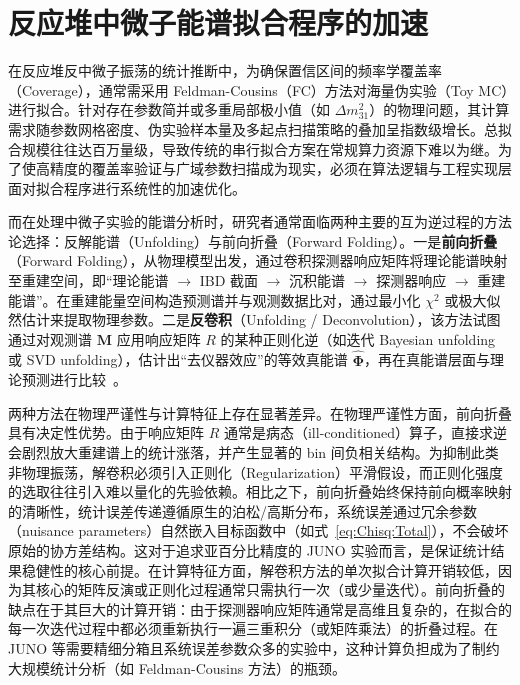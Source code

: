 \chapter{反应堆中微子能谱拟合程序的加速}

在反应堆反中微子振荡的统计推断中，为确保置信区间的频率学覆盖率（Coverage），通常需采用 Feldman-Cousins（FC）方法对海量伪实验（Toy MC）进行拟合。针对存在参数简并或多重局部极小值（如 $\Delta m^2_{31}$）的物理问题，其计算需求随参数网格密度、伪实验样本量及多起点扫描策略的叠加呈指数级增长。总拟合规模往往达百万量级，导致传统的串行拟合方案在常规算力资源下难以为继。为了使高精度的覆盖率验证与广域参数扫描成为现实，必须在算法逻辑与工程实现层面对拟合程序进行系统性的加速优化。

而在处理中微子实验的能谱分析时，研究者通常面临两种主要的互为逆过程的方法论选择：反解能谱（Unfolding）与前向折叠（Forward Folding）。一是\textbf{前向折叠}（Forward Folding），从物理模型出发，通过卷积探测器响应矩阵将理论能谱映射至重建空间，即“理论能谱 $\to$ IBD 截面 $\to$ 沉积能谱 $\to$ 探测器响应 $\to$ 重建能谱”。在重建能量空间构造预测谱并与观测数据比对，通过最小化 $\chi^2$ 或极大似然估计来提取物理参数。二是\textbf{反卷积}（Unfolding / Deconvolution），该方法试图通过对观测谱 $\boldsymbol{M}$ 应用响应矩阵 $R$ 的某种正则化逆（如迭代 Bayesian unfolding 或 SVD unfolding），估计出“去仪器效应”的等效真能谱 $\hat{\boldsymbol{\Phi}}$，再在真能谱层面与理论预测进行比较~\cite{An2021Unfolding, Canelli2025}。

两种方法在物理严谨性与计算特征上存在显著差异。在物理严谨性方面，前向折叠具有决定性优势。由于响应矩阵 $R$ 通常是病态（ill-conditioned）算子，直接求逆会剧烈放大重建谱上的统计涨落，并产生显著的 bin 间负相关结构。为抑制此类非物理振荡，解卷积必须引入正则化（Regularization）平滑假设，而正则化强度的选取往往引入难以量化的先验依赖。相比之下，前向折叠始终保持前向概率映射的清晰性，统计误差传递遵循原生的泊松/高斯分布，系统误差通过冗余参数（nuisance parameters）自然嵌入目标函数中（如式~\eqref{eq:Chisq:Total}），不会破坏原始的协方差结构。这对于追求亚百分比精度的 JUNO 实验而言，是保证统计结果稳健性的核心前提。在计算特征方面，解卷积方法的单次拟合计算开销较低，因为其核心的矩阵反演或正则化过程通常只需执行一次（或少量迭代）。前向折叠的缺点在于其巨大的计算开销：由于探测器响应矩阵通常是高维且复杂的，在拟合的每一次迭代过程中都必须重新执行一遍三重积分（或矩阵乘法）的折叠过程。在 JUNO 等需要精细分箱且系统误差参数众多的实验中，这种计算负担成为了制约大规模统计分析（如 Feldman-Cousins 方法）的瓶颈。


